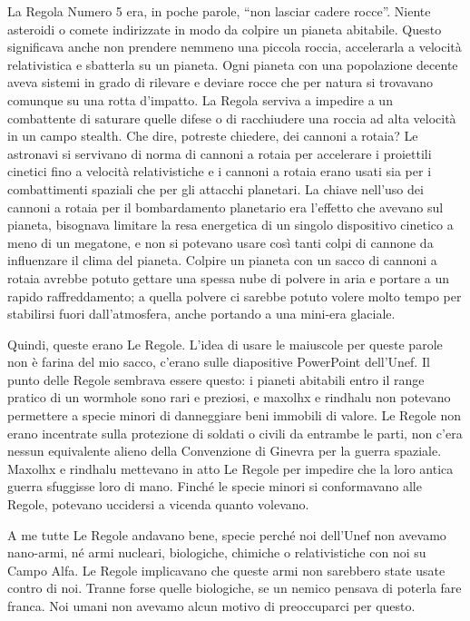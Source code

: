 La Regola Numero 5 era, in poche parole, ``non lasciar cadere rocce''.
Niente asteroidi o comete indirizzate in modo da colpire un pianeta
abitabile. Questo significava anche non prendere nemmeno una piccola
roccia, accelerarla a velocità relativistica e sbatterla su un pianeta.
Ogni pianeta con una popolazione decente aveva sistemi in grado di
rilevare e deviare rocce che per natura si trovavano comunque su una
rotta d'impatto. La Regola serviva a impedire a un combattente di
saturare quelle difese o di racchiudere una roccia ad alta velocità in
un campo stealth. Che dire, potreste chiedere, dei cannoni a rotaia? Le
astronavi si servivano di norma di cannoni a rotaia per accelerare i
proiettili cinetici fino a velocità relativistiche e i cannoni a rotaia
erano usati sia per i combattimenti spaziali che per gli attacchi
planetari. La chiave nell'uso dei cannoni a rotaia per il bombardamento
planetario era l'effetto che avevano sul pianeta, bisognava limitare la
resa energetica di un singolo dispositivo cinetico a meno di un
megatone, e non si potevano usare così tanti colpi di cannone da
influenzare il clima del pianeta. Colpire un pianeta con un sacco di
cannoni a rotaia avrebbe potuto gettare una spessa nube di polvere in
aria e portare a un rapido raffreddamento; a quella polvere ci sarebbe
potuto volere molto tempo per stabilirsi fuori dall'atmosfera, anche
portando a una mini-era glaciale.

Quindi, queste erano Le Regole. L'idea di usare le maiuscole per queste
parole non è farina del mio sacco, c'erano sulle diapositive PowerPoint
dell'Unef. Il punto delle Regole sembrava essere questo: i pianeti
abitabili entro il range pratico di un wormhole sono rari e preziosi, e
maxolhx e rindhalu non potevano permettere a specie minori di
danneggiare beni immobili di valore. Le Regole non erano incentrate
sulla protezione di soldati o civili da entrambe le parti, non c'era
nessun equivalente alieno della Convenzione di Ginevra per la guerra
spaziale. Maxolhx e rindhalu mettevano in atto Le Regole per impedire
che la loro antica guerra sfuggisse loro di mano. Finché le specie
minori si conformavano alle Regole, potevano uccidersi a vicenda quanto
volevano.

A me tutte Le Regole andavano bene, specie perché noi dell'Unef non
avevamo nano-armi, né armi nucleari, biologiche, chimiche o
relativistiche con noi su Campo Alfa. Le Regole implicavano che queste
armi non sarebbero state usate contro di noi. Tranne forse quelle
biologiche, se un nemico pensava di poterla fare franca. Noi umani non
avevamo alcun motivo di preoccuparci per questo.

